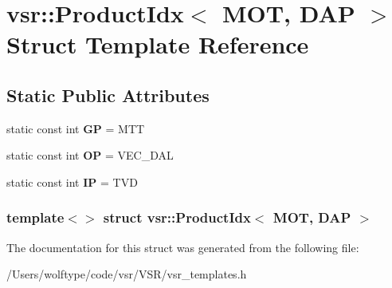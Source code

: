 \hypertarget{structvsr_1_1_product_idx_3_01_m_o_t_00_01_d_a_p_01_4}{\section{vsr\-:\-:Product\-Idx$<$ M\-O\-T, D\-A\-P $>$ Struct Template Reference}
\label{structvsr_1_1_product_idx_3_01_m_o_t_00_01_d_a_p_01_4}
}
\subsection*{Static Public Attributes}
\begin{DoxyCompactItemize}
\item 
\hypertarget{structvsr_1_1_product_idx_3_01_m_o_t_00_01_d_a_p_01_4_a6f6b1040df9eb7fae325b3c55f8f92e0}{static const int {\bfseries G\-P} = M\-T\-T}\label{structvsr_1_1_product_idx_3_01_m_o_t_00_01_d_a_p_01_4_a6f6b1040df9eb7fae325b3c55f8f92e0}

\item 
\hypertarget{structvsr_1_1_product_idx_3_01_m_o_t_00_01_d_a_p_01_4_ab2504fdae9e49c867feb87425108f86c}{static const int {\bfseries O\-P} = V\-E\-C\-\_\-\-D\-A\-L}\label{structvsr_1_1_product_idx_3_01_m_o_t_00_01_d_a_p_01_4_ab2504fdae9e49c867feb87425108f86c}

\item 
\hypertarget{structvsr_1_1_product_idx_3_01_m_o_t_00_01_d_a_p_01_4_aa34f03a69792966eefc5f312c5c39f69}{static const int {\bfseries I\-P} = T\-V\-D}\label{structvsr_1_1_product_idx_3_01_m_o_t_00_01_d_a_p_01_4_aa34f03a69792966eefc5f312c5c39f69}

\end{DoxyCompactItemize}
\subsubsection*{template$<$$>$ struct vsr\-::\-Product\-Idx$<$ M\-O\-T, D\-A\-P $>$}



The documentation for this struct was generated from the following file\-:\begin{DoxyCompactItemize}
\item 
/\-Users/wolftype/code/vsr/\-V\-S\-R/vsr\-\_\-templates.\-h\end{DoxyCompactItemize}
